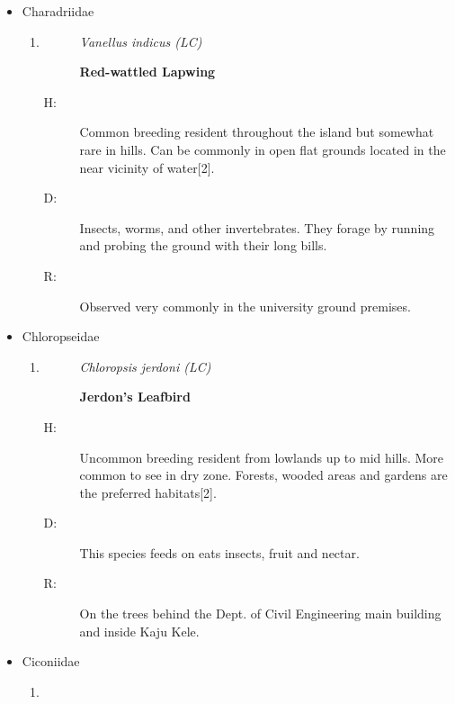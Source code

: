 \begin{itemize}
\begin{enumerate}
\begin{description}
\item[R: ]%
Observed in the tree canopy of Kaju Kele and behind the building located in Boat yard.%
\end{description}%
\end{enumerate}%
\item%
Charadriidae%
\begin{enumerate}%
\item%
\begin{description}%
\item[]%
\textit{Vanellus indicus (LC)}%
\item[]%
\textbf{Red{-}wattled Lapwing}%
\end{description}%
\begin{description}%
\item[H: ]%
Common breeding resident throughout the island but somewhat rare in hills. Can be commonly in open flat grounds located in the near vicinity of water{[}2{]}.%
\item[D: ]%
Insects, worms, and other invertebrates. They forage by running and probing the ground with their long bills.%
\item[R: ]%
Observed very commonly in the university ground premises.%
\end{description}%
\end{enumerate}%
\item%
Chloropseidae%
\begin{enumerate}%
\item%
\begin{description}%
\item[]%
\textit{Chloropsis jerdoni (LC)}%
\item[]%
\textbf{Jerdon's Leafbird}%
\end{description}%
\begin{description}%
\item[H: ]%
Uncommon breeding resident from lowlands up to mid hills. More common to see in dry zone. Forests, wooded areas and gardens are the preferred habitats{[}2{]}.%
\item[D: ]%
This species feeds on eats insects, fruit and nectar. %
\item[R: ]%
On the trees behind the Dept. of Civil Engineering main building and inside Kaju Kele.%
\end{description}%
\end{enumerate}%
\item%
Ciconiidae%
\begin{enumerate}%
\item%

\end{enumerate}
\end{itemize}
